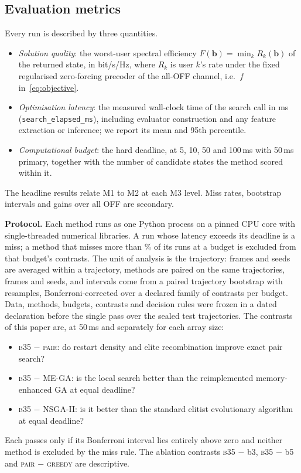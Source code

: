 \documentclass[runningheads]{llncs}
\newcommand{\bts}{\textsc{b35}}
\begin{document}
\subsection{Evaluation metrics}\label{sec:metrics}
Every run is described by three quantities.
\begin{itemize}
\item[\textbf{M1}] \emph{Solution quality}: the worst-user spectral efficiency $F(\mathbf b)=\min_k R_k(\mathbf b)$ of the returned state, in bit/s/Hz, where $R_k$ is user $k$'s rate under the fixed regularised zero-forcing precoder of the all-OFF channel, i.e.\ $f$ in~\eqref{eq:objective}.
\item[\textbf{M2}] \emph{Optimisation latency}: the measured wall-clock time of the search call in ms (\texttt{search\_elapsed\_ms}), including evaluator construction and any feature extraction or inference; we report its mean and 95th percentile.
\item[\textbf{M3}] \emph{Computational budget}: the hard deadline, at 5, 10, 50 and 100\,ms with 50\,ms primary, together with the number of candidate states the method scored within it.
\end{itemize}
The headline results relate M1 to M2 at each M3 level. Miss rates, bootstrap intervals and gains over all OFF are secondary.

\textbf{Protocol.} Each method runs as one Python process on a pinned CPU core with single-threaded numerical libraries. A run whose latency exceeds its deadline is a miss; a method that misses more than \% of its runs at a budget is excluded from that budget's contrasts. The unit of analysis is the trajectory: frames and  seeds are averaged within a trajectory, methods are paired on the same trajectories, frames and seeds, and intervals come from a paired trajectory bootstrap with  resamples, Bonferroni-corrected over a declared family of  contrasts per budget. Data, methods, budgets, contrasts and decision rules were frozen in a dated declaration before the single pass over the sealed test trajectories. The contrasts of this paper are, at 50\,ms and separately for each array size:
\begin{itemize}
\item[H1] \bts{} $-$ \textsc{pair}: do restart density and elite recombination improve exact pair search?
\item[H2] \bts{} $-$ ME-GA: is the local search better than the reimplemented memory-enhanced GA at equal deadline?
\item[H5] \bts{} $-$ NSGA-II: is it better than the standard elitist evolutionary algorithm at equal deadline?
\end{itemize}
Each passes only if its Bonferroni interval lies entirely above zero and neither method is excluded by the miss rule. The ablation contrasts \bts{} $-$ b3, \bts{} $-$ b5 and \textsc{pair} $-$ \textsc{greedy} are descriptive.
\end{document}

